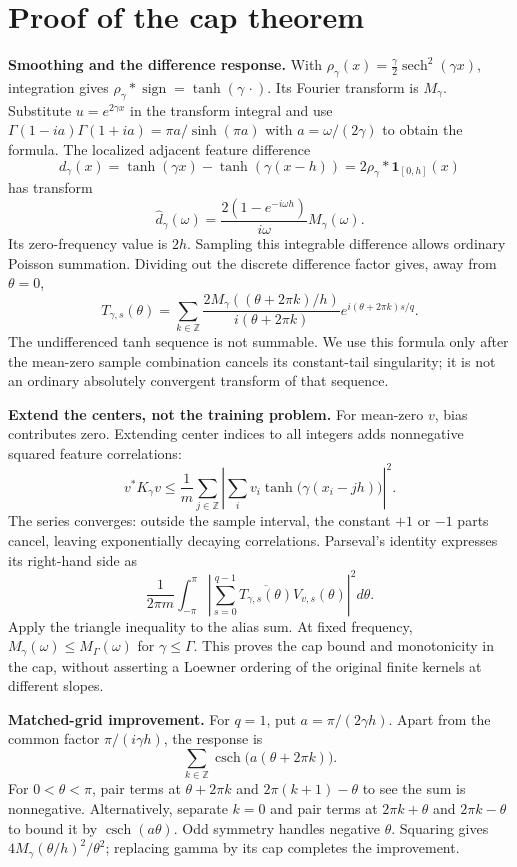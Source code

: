 \documentclass[11pt]{article}
\DeclareMathOperator{\sech}{sech}
\DeclareMathOperator{\csch}{csch}
\DeclareMathOperator{\sign}{sign}
\theoremstyle{definition}
\begin{document}
\section{Proof of the cap theorem}
\textbf{Smoothing and the difference response.}
With $\rho_\gamma(x)=\frac\gamma2\sech^2(\gamma x)$, integration gives
$\rho_\gamma*\sign=\tanh(\gamma\,\cdot)$. Its Fourier transform is
$M_\gamma$. Substitute $u=e^{2\gamma x}$ in the transform integral and use
$\Gamma(1-ia)\Gamma(1+ia)=\pi a/\sinh(\pi a)$ with
$a=\omega/(2\gamma)$ to obtain the formula. The localized adjacent
feature difference
\[
d_\gamma(x)=\tanh(\gamma x)-\tanh(\gamma(x-h))
=2\rho_\gamma*\mathbf1_{[0,h]}(x)
\]
has transform
\[
\widehat d_\gamma(\omega)=
\frac{2(1-e^{-i\omega h})}{i\omega}M_\gamma(\omega).
\]
Its zero-frequency value is $2h$. Sampling this integrable difference
allows ordinary Poisson summation. Dividing out the discrete difference
factor gives, away from $\theta=0$,
\[
T_{\gamma,s}(\theta)=\sum_{k\in\mathbb Z}
\frac{2M_\gamma((\theta+2\pi k)/h)}{i(\theta+2\pi k)}
e^{i(\theta+2\pi k)s/q}.
\]
The undifferenced tanh sequence is not summable. We use this formula only
after the mean-zero sample combination cancels its constant-tail
singularity; it is not an ordinary absolutely convergent transform of
that sequence.

\textbf{Extend the centers, not the training problem.}
For mean-zero $v$, bias contributes zero. Extending center indices to all
integers adds nonnegative squared feature correlations:
\[
v^*K_\gamma v\le\frac1m\sum_{j\in\mathbb Z}
\left|\sum_i v_i\tanh\bigl(\gamma(x_i-jh)\bigr)\right|^2.
\]
The series converges: outside the sample interval, the constant $+1$ or
$-1$ parts cancel, leaving exponentially decaying correlations.
Parseval's identity expresses its right-hand side as
\[
\frac1{2\pi m}\int_{-\pi}^{\pi}
\left|\sum_{s=0}^{q-1}\overline{T_{\gamma,s}(\theta)}V_{v,s}(\theta)\right|^2d\theta.
\]
Apply the triangle inequality to the alias sum. At fixed frequency,
$M_\gamma(\omega)\le M_\Gamma(\omega)$ for $\gamma\le\Gamma$.
This proves the cap bound and monotonicity in the cap, without asserting
a Loewner ordering of the original finite kernels at different slopes.

\textbf{Matched-grid improvement.}
For $q=1$, put $a=\pi/(2\gamma h)$. Apart from the common factor
$\pi/(i\gamma h)$, the response is
\[
\sum_{k\in\mathbb Z}\csch\bigl(a(\theta+2\pi k)\bigr).
\]
For $0<\theta<\pi$, pair terms at $\theta+2\pi k$ and
$2\pi(k+1)-\theta$ to see the sum is nonnegative. Alternatively,
separate $k=0$ and pair terms at $2\pi k+\theta$ and $2\pi k-\theta$
to bound it by $\csch(a\theta)$. Odd symmetry handles negative $\theta$.
Squaring gives $4M_\gamma(\theta/h)^2/\theta^2$; replacing gamma by
its cap completes the improvement.
\end{document}
